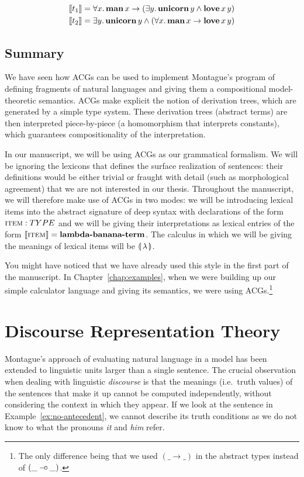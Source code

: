 \begin{align*}
  \llbracket t_1 \rrbracket &= \forall x.\, \textbf{man}\,x \to (\exists y.\, \textbf{unicorn}\,y \land \textbf{love}\,x\,y) \\
  \llbracket t_2 \rrbracket &= \exists y.\, \textbf{unicorn}\,y \land (\forall x.\, \textbf{man}\,x \to \textbf{love}\,x\,y)
\end{align*}


\subsection{Summary}
\label{ssec:acg-summary}

We have seen how ACGs can be used to implement Montague's program of
defining fragments of natural languages and giving them a compositional
model-theoretic semantics. ACGs make explicit the notion of derivation
trees, which are generated by a simple type system. These derivation trees
(abstract terms) are then interpreted piece-by-piece (a homomorphism that
interprets constants), which guarantees compositionality of the
interpretation.

In our manuscript, we will be using ACGs as our grammatical formalism. We
will be ignoring the lexicons that defines the surface realization of
sentences: their definitions would be either trivial or fraught with detail
(such as morphological agreement) that we are not interested in our
thesis. Throughout the manuscript, we will therefore make use of ACGs in
two modes: we will be introducing lexical items into the abstract signature
of deep syntax with declarations of the form $\textsc{item} : TYPE$ and we
will be giving their interpretations as lexical entries of the form
$\llbracket \textsc{item} \rrbracket = \textbf{lambda-banana-term}$. The calculus in which we
will be giving the meanings of lexical items will be ${\llparenthesis \, \lambda \, \rrparenthesis}$.

You might have noticed that we have already used this style in the first
part of the manuscript. In Chapter~\ref{chap:examples}, when we were
building up our simple calculator language and giving its semantics, we
were using ACGs.\footnote{The only difference being that we used
  $(\_ \to \_)$ in the abstract types instead of $(\_ \mathbin{{-}\mkern-3.5mu{\circ}} \_)$.}


\section{Discourse Representation Theory}
\label{sec:drt}

Montague's approach of evaluating natural language in a model has been
extended to linguistic units larger than a single sentence. The crucial
observation when dealing with linguistic \emph{discourse} is that the
meanings (i.e.\ truth values) of the sentences that make it up cannot be
computed independently, without considering the context in which they
appear. If we look at the sentence in Example~\ref{ex:no-antecedent}, we
cannot describe its truth conditions as we do not know to what the pronouns
\emph{it} and \emph{him} refer.


